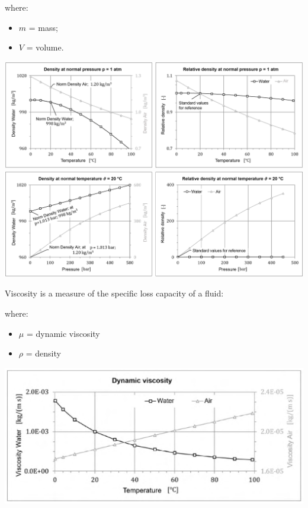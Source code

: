 \documentclass{article}
\begin{document}
where:
\begin{itemize}
    \item $m$ = mass;
    \item $V$ = volume.
\end{itemize}

\begin{center}
    \includegraphics[width=\textwidth]{media/Dichte_rhoT_en.PNG}
    \includegraphics[width=\textwidth]{media/Dichte_rhop_en.png}
\end{center}

Viscosity is a measure of the specific loss capacity of a fluid:
\figbox{$\nu \triangleq \dfrac{\mu}{\rho}\ \left[\dfrac{N\cdot s}{m^2} = Pa\cdot s\right]$}

where:
\begin{itemize}
    \item $\mu$ = dynamic viscosity
    \item $\rho$ = density
\end{itemize}

\begin{center}
    \includegraphics[width=.74\textwidth]{media/viscosity.png}
\end{center}
\end{document}
